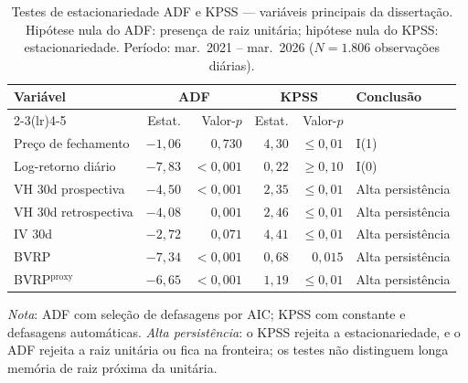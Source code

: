 \begin{table}[H]
\centering
\small
\caption[Testes de estacionariedade ADF e KPSS]{Testes de estacionariedade ADF e KPSS --- variáveis principais da dissertação. Hipótese nula do ADF: presença de raiz unitária; hipótese nula do KPSS: estacionariedade. Período: mar.\ 2021 -- mar.\ 2026 ($N = 1{.}806$ observações diárias).}
\label{tab:dados-adf-kpss}
\begin{tabular}{lrrrrl}
\toprule
Variável & \multicolumn{2}{c}{ADF} & \multicolumn{2}{c}{KPSS} & Conclusão \\
\cmidrule(lr){2-3}\cmidrule(lr){4-5}
 & Estat. & Valor-$p$ & Estat. & Valor-$p$ & \\
\midrule
Preço de fechamento & $-1{,}06$ & $0{,}730$ & $4{,}30$ & ${\leq}0{,}01$ & I(1) \\
Log-retorno diário & $-7{,}83$ & $< 0{,}001$ & $0{,}22$ & ${\geq}0{,}10$ & I(0) \\
VH 30d prospectiva & $-4{,}50$ & $< 0{,}001$ & $2{,}35$ & ${\leq}0{,}01$ & Alta persistência \\
VH 30d retrospectiva & $-4{,}08$ & $0{,}001$ & $2{,}46$ & ${\leq}0{,}01$ & Alta persistência \\
IV 30d & $-2{,}72$ & $0{,}071$ & $4{,}41$ & ${\leq}0{,}01$ & Alta persistência \\
BVRP & $-7{,}34$ & $< 0{,}001$ & $0{,}68$ & $0{,}015$ & Alta persistência \\
BVRP$^{\text{proxy}}$ & $-6{,}65$ & $< 0{,}001$ & $1{,}19$ & ${\leq}0{,}01$ & Alta persistência \\
\bottomrule
\end{tabular}
\par\smallskip
\parbox{0.95\linewidth}{\footnotesize\textit{Nota}: ADF com seleção de defasagens por AIC; KPSS com constante e defasagens automáticas. \textit{Alta persistência}: o KPSS rejeita a estacionariedade, e o ADF rejeita a raiz unitária ou fica na fronteira; os testes não distinguem longa memória de raiz próxima da unitária.}
\end{table}
